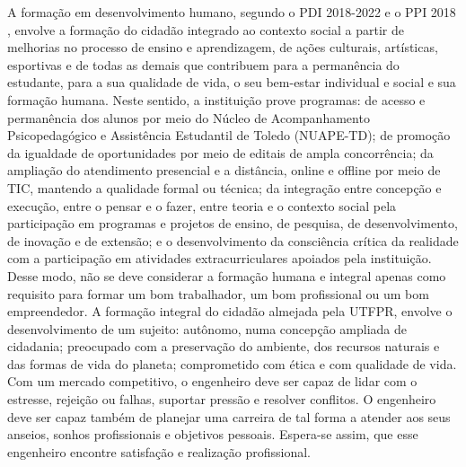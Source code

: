 A formação em desenvolvimento humano, segundo o PDI 2018-2022 \cite{pdiutfpr} e o PPI 2018 \cite{ppiutfpr}, envolve a formação do cidadão integrado ao contexto social a partir de melhorias no processo de ensino e aprendizagem, de ações culturais, artísticas, esportivas e de todas as demais que contribuem para a permanência do estudante, para a sua qualidade de vida, o seu bem-estar individual e social e sua formação humana.  Neste sentido, a instituição prove programas: de acesso e permanência dos alunos por meio do Núcleo de Acompanhamento Psicopedagógico e Assistência Estudantil de Toledo (NUAPE-TD); de promoção da igualdade de oportunidades por meio de editais de ampla concorrência; da ampliação do atendimento presencial e a distância, online e offline por meio de TIC, mantendo a qualidade formal ou técnica; da integração entre concepção e execução, entre o pensar e o fazer, entre teoria e o contexto social pela participação em programas e projetos de ensino, de pesquisa, de desenvolvimento, de inovação e de extensão; e o desenvolvimento da consciência crítica da realidade com a  participação em atividades extracurriculares apoiados pela instituição.  Desse modo, não se deve considerar a formação humana e integral apenas como requisito para formar um bom trabalhador, um bom profissional ou um bom empreendedor. A formação integral do cidadão almejada pela UTFPR, envolve o desenvolvimento de um sujeito: autônomo, numa concepção ampliada de cidadania; preocupado com a preservação do ambiente, dos recursos naturais e das formas de vida do planeta; comprometido com ética e com qualidade de vida. Com um mercado competitivo, o engenheiro deve ser capaz de lidar com o estresse, rejeição ou falhas, suportar pressão e resolver conflitos. O engenheiro deve ser capaz também de planejar uma carreira de tal forma a atender aos seus anseios, sonhos profissionais e objetivos pessoais. Espera-se assim, que esse engenheiro encontre satisfação e realização profissional.


